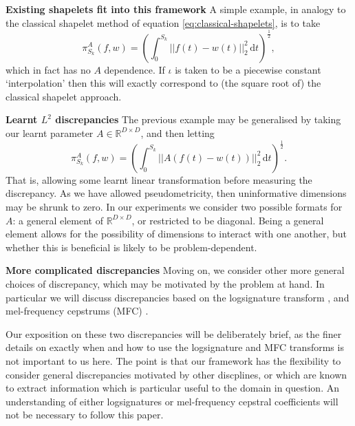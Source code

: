 \documentclass{article}
\theoremstyle{plain}
\theoremstyle{definition}
\newcommand{\reals}{\mathbb{R}}
\newcommand{\norm}[1]{\mathord|\!\mathord|#1\mathord|\!\mathord|} %
\newcommand{\dee}{\,\mathrm{d}}
\newcommand{\boldheading}[1]{

\textbf{#1}\quad}
\begin{document}
	\boldheading{Existing shapelets fit into this framework}
	A simple example, in analogy to the classical shapelet method of equation \eqref{eq:classical-shapelets}, is to take
	\begin{equation*}
	\pi^A_{S_k}(f, w) = (\int_{0}^{S_k} \norm{f(t) - w(t)}_2^2 \dee t)^{\frac{1}{2}},
	\end{equation*}
	which in fact has no $A$ dependence. If $\iota$ is taken to be a piecewise constant `interpolation' then this will exactly correspond to (the square root of) the classical shapelet approach.
	
	\boldheading{Learnt $L^2$ discrepancies}
	The previous example may be generalised by taking our learnt parameter $A \in \reals^{D \times D}$, and then letting
	\begin{equation}\label{eq:learnt-discrepancy}
	\pi^A_{S_k}(f, w) = (\int_{0}^{S_k} \norm{A(f(t) - w(t))}_2^2 \dee t)^{\frac{1}{2}}.
	\end{equation}
	That is, allowing some learnt linear transformation before measuring the discrepancy. As we have allowed pseudometricity, then uninformative dimensions may be shrunk to zero. In our experiments we consider two possible formats for $A$: a general element of $\reals^{D \times D}$, or restricted to be diagonal. Being a general element allows for the possibility of dimensions to interact with one another, but whether this is beneficial is likely to be problem-dependent.
	
	\boldheading{More complicated discrepancies}
	Moving on, we consider other more general choices of discrepancy, which may be motivated by the problem at hand. In particular we will discuss discrepancies based on the logsignature transform \cite{TODO}, and mel-frequency cepstrums (MFC) \cite{TODO}.
	
	Our exposition on these two discrepancies will be deliberately brief, as the finer details on exactly when and how to use the logsignature and MFC transforms is not important to us here. The point is that our framework has the flexibility to consider general discrepancies motivated by other discplines, or which are known to extract information which is particular useful to the domain in question. An understanding of either logsignatures or mel-frequency cepstral coefficients will not be necessary to follow this paper.
	
\end{document}
